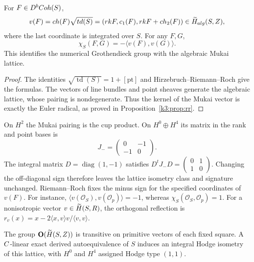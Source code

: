 \begin{proposition}
\label{prop:mukai-vector}
For $F\in D^bCoh(S)$,
\[
v(F)=ch(F)\sqrt{td(S)}
=(rk F,c_1(F),rk F+ch_2(F))
\in\widetilde H_{alg}(S,Z),
\]
where the last coordinate is integrated over $S$.  For any $F,G$,
\[
\chi_S(F,G)=-\langle v(F),v(G)\rangle.
\]
This identifies the numerical Grothendieck group with the algebraic
Mukai lattice.
\end{proposition}

\begin{proof}
The identities $\sqrt{\operatorname{td}(S)}=1+[\mathrm{pt}]$ and
Hirzebruch--Riemann--Roch give the formulas.  The vectors of line
bundles and point sheaves generate the algebraic lattice, whose
pairing is nondegenerate.  Thus the kernel of the Mukai vector is
exactly the Euler radical, as proved in
Proposition~\ref{k3:prop:rr}.
\end{proof}

\begin{remark}
\label{rem:mukai-rank-0-sign}
On $H^2$ the Mukai pairing is the cup product.  On $H^0\oplus H^4$
its matrix in the rank and point bases is
\[
J_- =\begin{pmatrix}0&-1\\-1&0\end{pmatrix}.
\]
The integral matrix $D=\operatorname{diag}(1,-1)$ satisfies
$D^tJ_-D=\left(\begin{smallmatrix}0&1\\1&0\end{smallmatrix}\right)$.
Changing the off-diagonal sign therefore leaves the lattice
isometry class and signature unchanged.  Riemann--Roch fixes the
minus sign for the specified coordinates of $v(F)$.  For instance,
$\langle v(\mathcal O_S),v(\mathcal O_p)\rangle=-1$, whereas
$\chi_S(\mathcal O_S,\mathcal O_p)=1$.
For a nonisotropic vector $v\in\widetilde H(S,R)$, the orthogonal
reflection is
$r_v(x)=x-2\langle x,v\rangle v/\langle v,v\rangle$.
\end{remark}

\begin{proposition}
\label{prop:mukai-aut}
The group $\mathbf{O}(\widetilde H(S,Z))$ is transitive on primitive
vectors of each fixed square.  A $C$-linear exact derived autoequivalence of $S$
induces an integral Hodge isometry of this lattice, with $H^0$ and
$H^4$ assigned Hodge type $(1,1)$.
\end{proposition}

